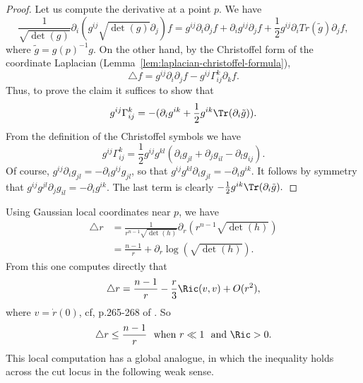 \begin{proof}
\sketch
{}
\leanok
Let us compute the derivative at a point $p$. We have
$$\frac{1}{\sqrt{\det(g)}}\partial_i
\left(g^{ij}\sqrt{\det(g)}\partial_j\right)f=g^{ij}\partial_i\partial_jf+\partial_ig^{ij}\partial_jf+
\frac{1}{2}g^{ij}\partial_iTr(\tilde g)\partial_jf,$$ where $\tilde
g=g(p)^{-1}g$. On the other hand, by the Christoffel form of the
coordinate Laplacian (Lemma~\ref{lem:laplacian-christoffel-formula}),
$$\triangle
f=g^{ij}\partial_i\partial_jf-g^{ij}\Gamma_{ij}^k\partial_kf.$$ Thus,
to prove the claim it suffices to show that
$$g^{ij}\Gamma_{ij}^k=-(\partial_ig^{ik}+\frac{1}{2}g^{ik}\Tr(\partial_i\tilde g)).$$
From the definition of the Christoffel symbols we have
$$g^{ij}\Gamma_{ij}^k=\frac{1}{2}g^{ij}g^{kl}(\partial_ig_{jl}+\partial_jg_{il}-\partial_lg_{ij}).$$
Of course, $g^{ij}\partial_ig_{jl}=-\partial_ig^{ij}g_{jl}$, so that
 $g^{ij}g^{kl}\partial_ig_{jl}=-\partial_ig^{ik}$. It follows by symmetry that $g^{ij}g^{jl}\partial_jg_{il}
 =-\partial_ig^{ik}$. The last term is clearly $-\frac{1}{2}g^{ik}\Tr(\partial_i\tilde g).$
\end{proof}

Using Gaussian local coordinates near $p$, we have
\begin{align*}
\triangle r &=
\frac{1}{r^{n-1}\sqrt{\det(h)}}\partial_r\left(r^{n-1}\sqrt{\det(h)}\right)\\
&= \frac{n-1}{r}
 + \partial_r\log\left(\sqrt{\det(h)}\right).
\end{align*}
From this one computes directly that
 \[ \triangle r
 = \frac{n-1}{r} - \frac{r}{3}\Ric(v,v)+ O(r^{2}), \]
 where $v = \dot r(0)$, cf,  p.265-268 of \cite{Petersen}. So
 $$\triangle r \leq
 \frac{n-1}{r}\ \ \text{when } r \ll 1\ \ \text{and } \Ric > 0.$$
This local computation has a global analogue, in which the
inequality holds across the cut locus in the following weak sense.

